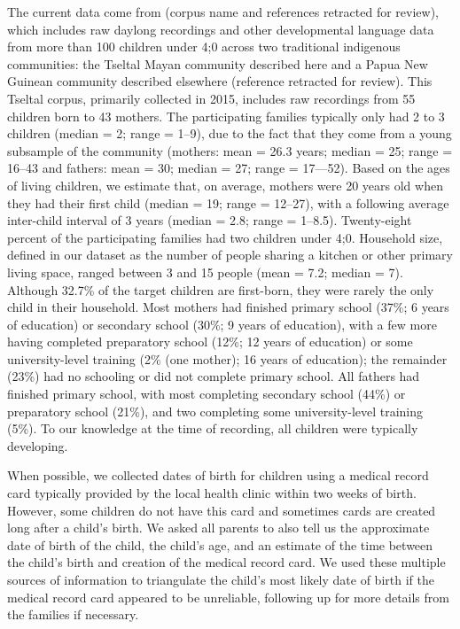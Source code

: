 \documentclass[floatsintext,man]{apa6}
\theoremstyle{definition}
\theoremstyle{definition}
\theoremstyle{definition}
\theoremstyle{remark}
\begin{document}
The current data come from (corpus name and references retracted for
review), which includes raw daylong recordings and other developmental
language data from more than 100 children under 4;0 across two
traditional indigenous communities: the Tseltal Mayan community
described here and a Papua New Guinean community described elsewhere
(reference retracted for review). This Tseltal corpus, primarily
collected in 2015, includes raw recordings from 55 children born to 43
mothers. The participating families typically only had 2 to 3 children
(median = 2; range = 1--9), due to the fact that they come from a young
subsample of the community (mothers: mean = 26.3 years; median = 25;
range = 16--43 and fathers: mean = 30; median = 27; range = 17---52).
Based on the ages of living children, we estimate that, on average,
mothers were 20 years old when they had their first child (median = 19;
range = 12--27), with a following average inter-child interval of 3
years (median = 2.8; range = 1--8.5). Twenty-eight percent of the
participating families had two children under 4;0. Household size,
defined in our dataset as the number of people sharing a kitchen or
other primary living space, ranged between 3 and 15 people (mean = 7.2;
median = 7). Although 32.7\% of the target children are first-born, they
were rarely the only child in their household. Most mothers had finished
primary school (37\%; 6 years of education) or secondary school (30\%; 9
years of education), with a few more having completed preparatory school
(12\%; 12 years of education) or some university-level training (2\%
(one mother); 16 years of education); the remainder (23\%) had no
schooling or did not complete primary school. All fathers had finished
primary school, with most completing secondary school (44\%) or
preparatory school (21\%), and two completing some university-level
training (5\%). To our knowledge at the time of recording, all children
were typically developing.

When possible, we collected dates of birth for children using a medical
record card typically provided by the local health clinic within two
weeks of birth. However, some children do not have this card and
sometimes cards are created long after a child's birth. We asked all
parents to also tell us the approximate date of birth of the child, the
child's age, and an estimate of the time between the child's birth and
creation of the medical record card. We used these multiple sources of
information to triangulate the child's most likely date of birth if the
medical record card appeared to be unreliable, following up for more
details from the families if necessary.
\end{document}
